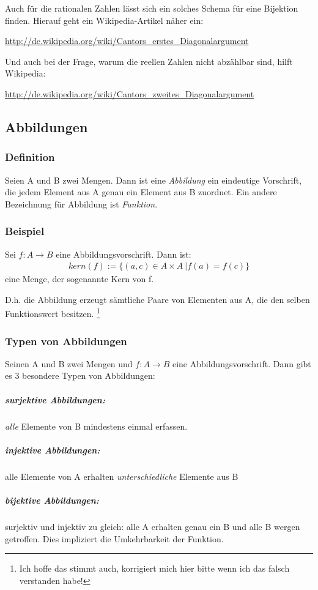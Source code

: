 \documentclass[a4paper,12pt, DIV12]{scrartcl}
\begin{document}
Auch für die rationalen Zahlen lässt sich ein solches Schema für eine Bijektion finden.
Hierauf geht ein Wikipedia-Artikel näher ein:

\url{http://de.wikipedia.org/wiki/Cantors_erstes_Diagonalargument}

Und auch bei der Frage, warum die reellen Zahlen nicht abzählbar sind, hilft Wikipedia:

\url{http://de.wikipedia.org/wiki/Cantors_zweites_Diagonalargument}

\subsection{Abbildungen}
\subsubsection{Definition}
Seien A und B zwei Mengen.
Dann ist eine \emph{Abbildung} ein eindeutige Vorschrift, die jedem Element aus A genau ein Element aus B zuordnet.
Ein andere Bezeichnung für Abbildung ist \emph{Funktion}.
\subsubsection{Beispiel}
Sei $f:{A}\longrightarrow{B}$ eine Abbildungsvorschrift.
Dann ist:
\begin{align*}
   kern(f) := \{(a,c) \in A \times A\ | f(a)=f(c)\}
\end{align*}
eine Menge, der sogenannte Kern von f.

D.h. die Abbildung erzeugt sämtliche Paare von Elementen aus A, die den selben Funktionswert besitzen.
\footnote{Ich hoffe das stimmt auch, korrigiert mich hier bitte wenn
  ich das falsch verstanden habe!}
\newpage
\subsubsection{Typen von Abbildungen}
Seinen A und B zwei Mengen und $f:{A}\longrightarrow{B}$ eine Abbildungsvorschrift.
Dann gibt es 3 besondere Typen von Abbildungen:
\subparagraph*{surjektive Abbildungen:} \emph{alle} Elemente von B mindestens einmal erfassen.
\subparagraph*{injektive Abbildungen:} alle Elemente von A erhalten \emph{unterschiedliche} Elemente aus B
\subparagraph*{bijektive Abbildungen:} surjektiv und injektiv zu gleich: alle A erhalten genau ein B und alle B wergen getroffen.
Dies impliziert die Umkehrbarkeit der Funktion.
\end{document}
